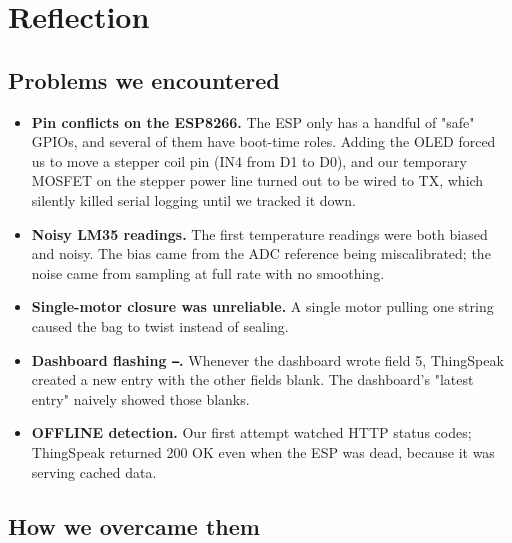 \documentclass{article}
\begin{document}
\fi

\section{Reflection}
\label{sec:reflection}

\subsection{Problems we encountered}
\label{sec:reflection-problems}

\begin{itemize}
    \item \textbf{Pin conflicts on the ESP8266.} The ESP only has a handful of "safe" GPIOs, and several of them have boot-time roles. Adding the OLED forced us to move a stepper coil pin (IN4 from D1 to D0), and our temporary MOSFET on the stepper power line turned out to be wired to TX, which silently killed serial logging until we tracked it down.
    \item \textbf{Noisy LM35 readings.} The first temperature readings were both biased and noisy. The bias came from the ADC reference being miscalibrated; the noise came from sampling at full rate with no smoothing.
    \item \textbf{Single-motor closure was unreliable.} A single motor pulling one string caused the bag to twist instead of sealing.
    \item \textbf{Dashboard flashing \texttt{--}.} Whenever the dashboard wrote field 5, ThingSpeak created a new entry with the other fields blank. The dashboard's "latest entry" naively showed those blanks.
    \item \textbf{OFFLINE detection.} Our first attempt watched HTTP status codes; ThingSpeak returned 200 OK even when the ESP was dead, because it was serving cached data.
\end{itemize}

\subsection{How we overcame them}
\label{sec:reflection-overcame}
\end{document}
